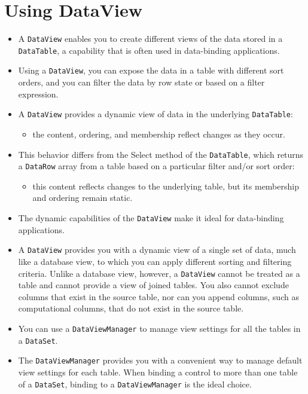 \section{Using DataView}
\begin{itemize}
	\item A \texttt{DataView} enables you to create different views of the data stored in a \texttt{DataTable}, a capability that is often used
	in data-binding applications. 
	\item Using a \texttt{DataView}, you can expose the data in a table with different sort orders, and	you can filter the data by row state or based on a filter expression.
	\item A \texttt{DataView} provides a dynamic view of data in the underlying \texttt{DataTable}: 
	\begin{itemize}
		\item the content, ordering, and membership reflect changes as they occur. 
	\end{itemize}
	\item This behavior differs from the Select method of the \texttt{DataTable}, which returns a \texttt{DataRow} array from a table based on a particular filter and/or sort order:
\begin{itemize}
	\item this content reflects changes to the underlying table, but its membership and ordering remain static. 
\end{itemize}
	\item The dynamic capabilities of the \texttt{DataView} make it ideal for data-binding applications.
	\item A \texttt{DataView} provides you with a dynamic view of a single set of data, much like a database view, to which you can apply different sorting and filtering criteria. Unlike a database view, however, a \texttt{DataView} cannot be treated as a table and cannot provide a view of joined tables. You also cannot exclude columns that exist in the source table, nor can you append columns, such as computational columns, that do not exist in the source table.
	
	\item You can use a \texttt{DataViewManager} to manage view settings for all the tables in a \texttt{DataSet}. 
	\item The \texttt{DataViewManager} provides you with a convenient way to manage default view settings for each table. When binding a control to more than one table of a \texttt{DataSet}, binding to a \texttt{DataViewManager} is the ideal choice.
\end{itemize}




